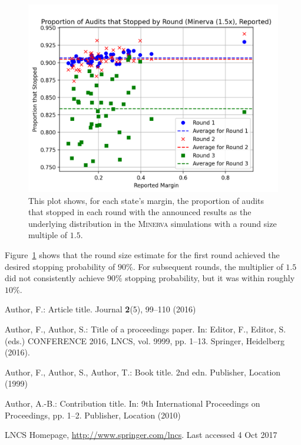 \documentclass[runningheads]{llncs}
\newcommand{\Minerva}{\textsc{Minerva}\xspace}
\begin{document}
\begin{figure}[H]
\includegraphics[width=\textwidth]{minerva_multiround_1p5x_10^4/sprobs_first_three.png}
\caption{This plot shows, for each state's margin, the proportion of audits that stopped in each round
with the announced results as the underlying distribution
in the \Minerva simulations with a round size multiple of $1.5$.}
\label{fig:minerva1p5_sprob}
\end{figure}

Figure~\ref{fig:minerva1p5_sprob} shows that the round size estimate for the first round achieved the desired
stopping probability of $90\%$. For subsequent rounds, the multiplier of $1.5$ did not consistently achieve $90\%$ stopping
probability, but it was within  roughly $10\%$. 







%
%
%
% 
% 
%
\begin{thebibliography}{8}
Author, F.: Article title. Journal \textbf{2}(5), 99--110 (2016)

Author, F., Author, S.: Title of a proceedings paper. In: Editor,
F., Editor, S. (eds.) CONFERENCE 2016, LNCS, vol. 9999, pp. 1--13.
Springer, Heidelberg (2016). 

Author, F., Author, S., Author, T.: Book title. 2nd edn. Publisher,
Location (1999)

Author, A.-B.: Contribution title. In: 9th International Proceedings
on Proceedings, pp. 1--2. Publisher, Location (2010)

LNCS Homepage, \url{http://www.springer.com/lncs}. Last accessed 4
Oct 2017
\end{thebibliography}
\end{document}
